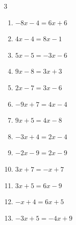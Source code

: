 \begin{multicols}{3}
\begin{enumerate}

  \item $-8x-4=6x+6$


\columnbreak %

\resetques

  \item $4x-4=8x-1$


  \item $5x-5=-3x-6$


  \item $9x-8=3x+3$


  \item $2x-7=3x-6$

        \phantom{$\displaystyle x=-1$}

  \item $-9x+7=4x-4$


  \item $9x+5=4x-8$


  \item $-3x+4=2x-4$


  \item $-2x-9=2x-9$

        \phantom{$\displaystyle x=0$}

  \item $3x+7=-x+7$

        \phantom{$\displaystyle x=0$}

  \item $3x+5=6x-9$


  \item $-x+4=6x+5$


  \item $-3x+5=-4x+9$

        \phantom{$\displaystyle x=4$}


\end{enumerate}
\end{multicols}
